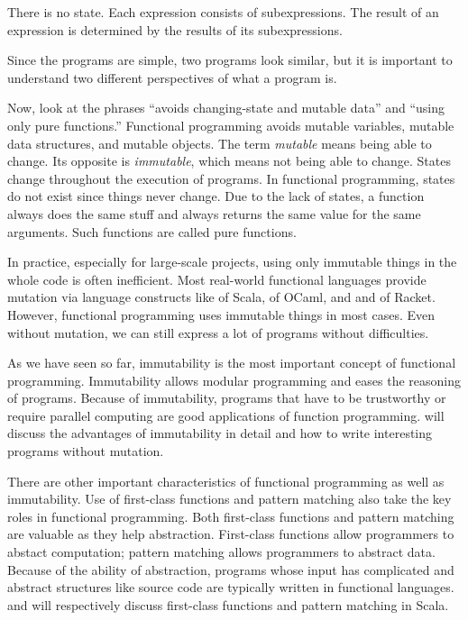 There is no state. Each expression consists of subexpressions. The result of
an expression is determined by the results of its subexpressions.

Since the programs are simple, two programs look similar, but it is important to
understand two different perspectives of what a program is.

Now, look at the phrases ``avoids changing-state and mutable data'' and ``using
only pure functions.'' Functional programming avoids mutable variables, mutable data
structures, and mutable objects. The term \textit{mutable}
means being able to change. Its opposite is \textit{immutable},
which means not being able to change. States change throughout the execution of programs.
In functional programming, states do not exist since things never change.
Due to the lack of states, a function always does the same stuff
and always returns the same value for the same arguments. Such functions
are called pure functions.

In practice, especially for large-scale projects, using only immutable things in
the whole code is often inefficient. Most real-world functional languages
provide mutation via language constructs like  of Scala,  of
OCaml, and  and  of Racket. However,
functional programming uses immutable things in most cases. Even without
mutation, we can still express a lot of programs without difficulties.

As we have seen so far,
immutability is the most important concept of functional programming.
Immutability allows modular programming and eases the reasoning of programs.
Because of immutability, programs that have to be trustworthy or require parallel computing
are good applications of function programming.
 will discuss the advantages of immutability in detail and
how to write interesting programs without mutation.

There are other important characteristics of functional programming as well as
immutability. Use of first-class functions and pattern matching also take the
key roles in functional programming. Both first-class functions and pattern matching
are valuable as they help abstraction. First-class functions allow programmers
to abstact computation; pattern matching allows programmers to abstract
data. Because of the ability of abstraction,
programs whose input has complicated and abstract structures like source code
are typically written in functional languages.
 and  will respectively discuss first-class
functions and pattern matching in Scala.

